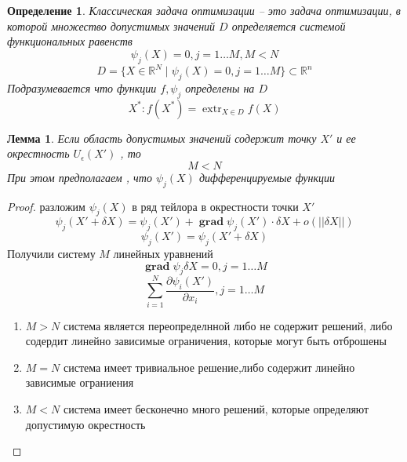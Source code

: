 \documentclass[14pt]{extarticle}
\newtheorem{definiiton}{Определение}
\newtheorem{lemma}{Лемма}
\DeclareMathOperator{\extr}{extr}
\DeclareMathOperator{\grad}{\textbf{grad}}
\begin{document}
\begin{definiiton}
	Классическая задача оптимизации -- 
	это задача оптимизации, в которой множество
	допустимых значений $D$ определяется 
	системой функциональных  равенств
	\begin{equation}
		\psi_{j} (X) = 0, j = 1 \dots M, M < N
	\end{equation}
	\begin{equation}
		D = \{X \in \mathbb{R}^{N} \mid \psi_{j}(X) = 0,j=1 \dots M\} \subset \mathbb{R}^{n}
	\end{equation}
	Подразумевается что функции $f,\psi_{j}$ определены на $D$
	 \begin{equation}
		 X^{*} : f(X^{*}) = \extr_{X \in D} f(X)
	\end{equation}
\end{definiiton}
\begin{lemma}
	Если область допустимых значений содержит точку 
	$X'$ и ее окрестность  $U_{\epsilon}(X')$ , то
	\begin{equation}
		M < N
	\end{equation}
	При этом предполагаем , что $\psi_{j}(X)$ дифференцируемые функции
\end{lemma}
\begin{proof}
	разложим $\psi_{j}(X) $ в ряд тейлора в окрестности точки $X'$
	\begin{equation}
		\psi_{j}(X' + \delta X) = \psi_{j}(X') + \grad \psi_{j}(X') \cdot \delta X + o(||\delta X||)
	\end{equation}
	\begin{equation}
		\psi_{j}(X') = \psi_{j}(X' + \delta X)
	\end{equation}
	Получили систему $M$ линейных уравнений
	 \begin{equation}
		 \grad \psi_{j} \delta X = 0 , j = 1 \dots M
	\end{equation}
	\begin{equation}
		\sum_{i =1}^{N} \frac{\partial \psi_{i}(X')}{\partial x_{i}} ,j = 1 \dots M
	\end{equation}
	\begin{enumerate}
		\item $M > N$ система является переопределнной либо
			не содержит решений, либо содердит линейно
			зависимые ограничения, которые могут быть отброшены
		\item  $M  = N$ система имеет  тривиальное решение,либо содержит линейно зависимые ограниения
		\item  $M < N$ система имеет бесконечно много решений, которые определяют допустимую окрестность
	\end{enumerate}
\end{proof}
\end{document}
